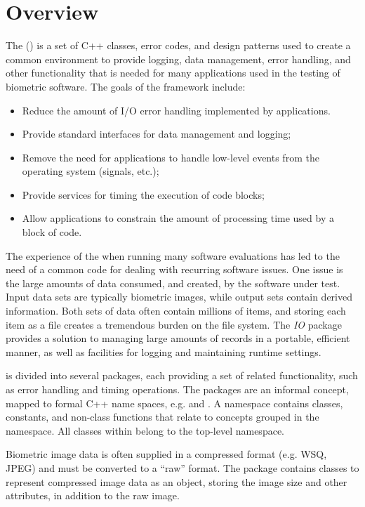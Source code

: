 \chapter{Overview}

The \lname (\sname)
is a set of C++\cite{cpp:plguide} classes, error codes, and design
patterns used to create a common environment to provide logging, data
management, error handling, and other functionality that is needed for many
applications used in the testing of biometric software. The goals of the
framework include:
\begin{itemize}
\item Reduce the amount of I/O error handling implemented by applications.
\item Provide standard interfaces for data management and logging;
\item Remove the need for applications to handle low-level events from the
operating system (signals, etc.);
\item Provide services for timing the execution of code blocks;
\item Allow applications to constrain the amount of processing time used
by a block of code.
\end{itemize}

The experience of the \nistig when running many software evaluations has led
to the need of a common code for dealing with recurring software issues. One
issue is the large amounts of data consumed, and created, by the software
under test. Input data sets are typically biometric images, while output sets
contain derived information. Both sets of data often contain millions of
items, and storing each item as a file creates a tremendous burden on the file
system. The {\em IO} package provides a solution to
managing large amounts of records in a portable, efficient manner, as well as 
facilities for logging and maintaining runtime settings.

\sname is divided into several packages, each providing a set of
related functionality, such as error handling and timing operations. The
packages are an informal concept, mapped to formal C++ name spaces, e.g.
 and . A namespace contains classes, constants, and 
non-class functions that relate to concepts grouped in the namespace.
All classes within \sname belong to the top-level 
namespace.

Biometric image data is often supplied in a compressed format (e.g. WSQ, JPEG)
and must be converted to a ``raw'' format. The  package contains
classes to represent compressed image data as an object, storing the image
size and other attributes, in addition to the raw image.

